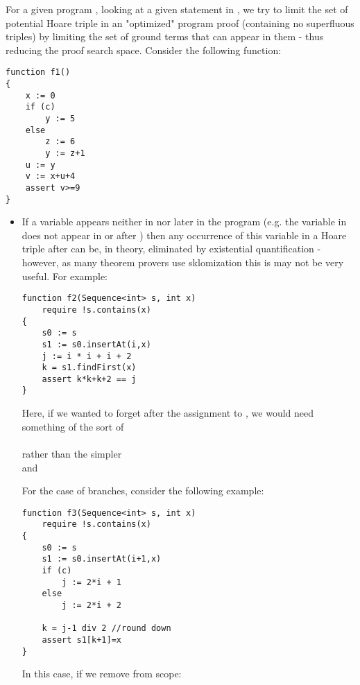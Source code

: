 	For a given program , looking at a given statement  in , we try to limit the set of potential Hoare triple in an "optimized" program proof (containing no superfluous triples) by limiting the set of ground terms that can appear in them - thus reducing the proof search space.
	Consider the following function:
\begin{lstlisting}
function f1()
{
	x := 0
	if (c)
		y := 5
	else
		z := 6
		y := z+1
	u := y
	v := x+u+4
	assert v>=9
}
\end{lstlisting}		
	\begin{itemize}
		\item If a variable  appears neither in  nor later in the program (e.g. the variable  in  does not appear in or after  ) then any occurrence of this variable in a Hoare triple after  can be, in theory,  eliminated by existential quantification - however, as many theorem provers use sklomization this is may not be very useful.
		For example:
\begin{lstlisting}
function f2(Sequence<int> s, int x)
	require !s.contains(x)
{
	s0 := s
	s1 := s0.insertAt(i,x)
	j := i * i + i + 2
	k = s1.findFirst(x)
	assert k*k+k+2 == j
}
\end{lstlisting}		
		Here, if we wanted to forget  after the assignment to , we would need something of the sort of \\  \\
		rather than the simpler \\
		 and \\
		
		For the case of branches, consider the following example:
\begin{lstlisting}
function f3(Sequence<int> s, int x)
	require !s.contains(x)
{
	s0 := s
	s1 := s0.insertAt(i+1,x)
	if (c)
		j := 2*i + 1
	else
		j := 2*i + 2
			
	k = j-1 div 2 //round down
	assert s1[k+1]=x
}
\end{lstlisting}		
		
		In this case, if we remove  from scope:
		\begin{itemize}
		

\end{itemize}
\end{itemize}
